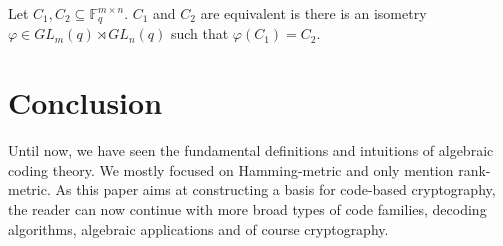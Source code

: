 \begin{definition}
Let $C_1, C_2 \subseteq \mathbb{F}_q^{m \times n}$. $C_1$ and $C_2$ are equivalent is there is an isometry $\varphi\in GL_m(q) \rtimes GL_n(q)$ such that $\varphi(C_1) = C_2$.
\end{definition}

\section{Conclusion}
Until now, we have seen the fundamental definitions and intuitions of algebraic coding theory. We mostly focused on Hamming-metric and only mention rank-metric. As this paper aims at constructing a basis for code-based cryptography, the reader can now continue with more broad types of code families, decoding algorithms, algebraic applications and of course cryptography.